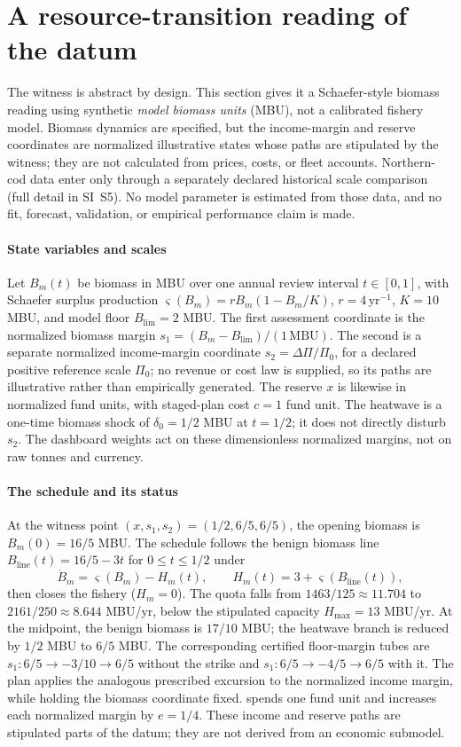 \section{A resource-transition reading of the datum}\label{sec:benchmark}

The witness is abstract by design. This section gives it a Schaefer-style biomass reading using synthetic \emph{model biomass units} (MBU), not a calibrated fishery model. Biomass dynamics are specified, but the income-margin and reserve coordinates are normalized illustrative states whose paths are stipulated by the witness; they are not calculated from prices, costs, or fleet accounts. Northern-cod data enter only through a separately declared historical scale comparison (full detail in SI~S5). No model parameter is estimated from those data, and no fit, forecast, validation, or empirical performance claim is made.

\paragraph{State variables and scales} Let $B_m(t)$ be biomass in MBU over one annual review interval $t\in[0,1]$, with Schaefer surplus production $\varsigma(B_m)=rB_m(1-B_m/K)$, $r=4\,\mathrm{yr}^{-1}$, $K=10$ MBU, and model floor $B_{\mathrm{lim}}=2$ MBU. The first assessment coordinate is the normalized biomass margin $s_1=(B_m-B_{\mathrm{lim}})/(1\,\mathrm{MBU})$. The second is a separate normalized income-margin coordinate $s_2=\Delta\Pi/\Pi_0$, for a declared positive reference scale $\Pi_0$; no revenue or cost law is supplied, so its paths are illustrative rather than empirically generated. The reserve $x$ is likewise in normalized fund units, with staged-plan cost $c=1$ fund unit. The heatwave is a one-time biomass shock of $\delta_0=1/2$ MBU at $t=1/2$; it does not directly disturb $s_2$. The dashboard weights act on these dimensionless normalized margins, not on raw tonnes and currency.

\paragraph{The schedule and its status} At the witness point $(x,s_1,s_2)=(1/2,6/5,6/5)$, the opening biomass is $B_m(0)=16/5$ MBU. The  schedule follows the benign biomass line $B_{\mathrm{line}}(t)=16/5-3t$ for $0\le t\le1/2$ under
\[
\dot B_m=\varsigma(B_m)-H_m(t),\qquad H_m(t)=3+\varsigma(B_{\mathrm{line}}(t)),
\]
then closes the fishery ($H_m=0$). The quota falls from $1463/125\approx11.704$ to $2161/250\approx8.644$ MBU/yr, below the stipulated capacity $H_{\max}=13$ MBU/yr. At the midpoint, the benign biomass is $17/10$ MBU; the heatwave branch is reduced by $1/2$ MBU to $6/5$ MBU. The corresponding certified floor-margin tubes are $s_1:6/5\to-3/10\to6/5$ without the strike and $s_1:6/5\to-4/5\to6/5$ with it. The  plan applies the analogous prescribed excursion to the normalized income margin, while holding the biomass coordinate fixed.  spends one fund unit and increases each normalized margin by $e=1/4$. These income and reserve paths are stipulated parts of the datum; they are not derived from an economic submodel.

